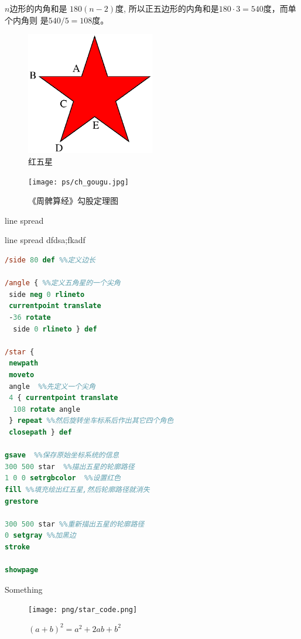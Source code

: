 \documentclass[main.tex]{subfiles}
\begin{document}
\begin{example} $n$边形的内角和是 $180(n-2)$度, 所以正五边形的内角和是$180\cdot 3 = 540$度，而单个内角则 是$540/5 = 108$度。
\end{example}

\begin{figure}[h]
	\centering
	\includegraphics[width=0.5\textwidth]{images/star.eps}
	\caption{红五星}
	\label{fig:III.1.2}
\end{figure}

\begin{figure}[h]
	\centering
	\texttt{[image: ps/ch\_gougu.jpg]}
	\caption{《周髀算经》勾股定理图}
	\label{fig:III.1.3}
\end{figure}

line spread

line spread
dfdsa;fkadf

\begin{spacing}{0.8}
\begin{lstlisting}[language=PostScript]
%!PS-Adobe-3.0
/side 80 def %%定义边长 

/angle { %%定义五角星的一个尖角
 side neg 0 rlineto
 currentpoint translate
 -36 rotate
  side 0 rlineto } def

/star {
 newpath
 moveto
 angle  %%先定义一个尖角
 4 { currentpoint translate
  108 rotate angle 
 } repeat %%然后旋转坐车标系后作出其它四个角色
 closepath } def

gsave  %%保存原始坐标系统的信息
300 500 star  %%描出五星的轮廓路径
1 0 0 setrgbcolor  %%设置红色
fill %%填充绘出红五星,然后轮廓路径就消失
grestore

300 500 star %%重新描出五星的轮廓路径
0 setgray %%加黑边
stroke

showpage
\end{lstlisting}
\end{spacing}



Something
\begin{figure}[h]
	\centering
	\texttt{[image: png/star\_code.png]}
	\caption{$(a+b)^2 = a^2 + 2ab + b^2$}
	\label{fig:III.1.3}
\end{figure}
\end{document}
